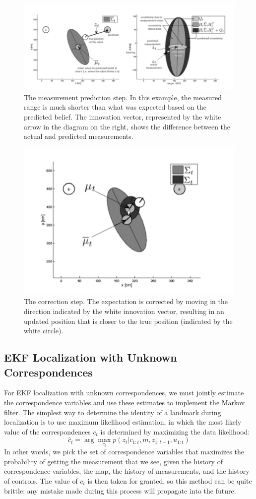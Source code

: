\documentclass[twoside]{article}
\begin{document}
\begin{figure}[H]
\centering
\includegraphics[width=.7\linewidth]{MeasurementPredictionStep.png}
\caption{The measurement prediction step. In this example, the measured range is much shorter than what was expected based on the predicted belief. The innovation vector, represented by the white arrow in the diagram on the right, shows the difference between the actual and predicted measurements.}
\label{fig:MeasurementStep}
\end{figure}

\begin{figure}[H]
\centering
\includegraphics[width=.7\linewidth]{CorrectionStep.png}
\caption{The correction step. The expectation is corrected by moving in the direction indicated by the white innovation vector, resulting in an updated position that is closer to the true position (indicated by the white circle).}
\label{fig:MeasurementStep}
\end{figure}

\subsection{EKF Localization with Unknown Correspondences}
For EKF localization with unknown correspondences, we must jointly estimate the correspondence variables and use these estimates to implement the Markov filter. The simplest way to determine the identity of a landmark during localization is to use maximum likelihood estimation, in which the most likely value of the correspondences $c_t$ is determined by maximizing the data likelihood:
\begin{equation}
    \hat { c } _ { t } = \arg \max _ { c _ { t } } p \left( z _ { t } | c _ { 1 : t } , m , z _ { 1 : t - 1 } , u _ { 1 : t } \right)
\end{equation}
In other words, we pick the set of correspondence variables that maximizes the probability of getting the
measurement that we see, given the history of correspondence variables, the map, the history of measurements, and the history of controls. The value of $c_t$ is then taken for granted, so this method can be quite brittle; any mistake made during this process will propagate into the future.
\end{document}
